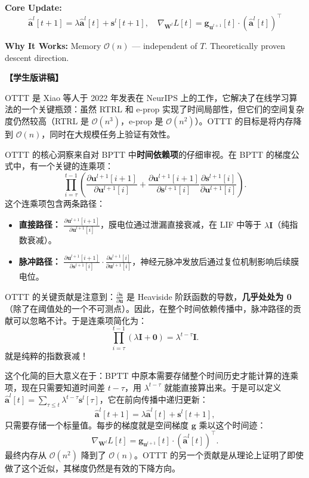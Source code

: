 \documentclass[journal,12pt,onecolumn]{IEEEtran}
\begin{document}
\textbf{Core Update:}
\begin{equation}
    \hat{\mathbf{a}}^l[t+1] = \lambda \hat{\mathbf{a}}^l[t] + \mathbf{s}^l[t+1], \quad 
    \nabla_{\mathbf{W}^l} L[t] = \mathbf{g}_{\mathbf{u}^{l+1}}[t] \cdot (\hat{\mathbf{a}}^l[t])^\top
\end{equation}

\textbf{Why It Works:} Memory $\mathcal{O}(n)$ — independent of $T$. Theoretically proven descent direction.


\textbf{【学生版讲稿】}

OTTT 是 Xiao 等人于 2022 年发表在 NeurIPS 上的工作，它解决了在线学习算法的一个关键瓶颈：虽然 RTRL 和 e-prop 实现了时间局部性，但它们的空间复杂度仍然较高（RTRL 是 $\mathcal{O}(n^3)$，e-prop 是 $\mathcal{O}(n^2)$）。OTTT 的目标是将内存降到 $\mathcal{O}(n)$，同时在大规模任务上验证有效性。

OTTT 的核心洞察来自对 BPTT 中\textbf{时间依赖项}的仔细审视。在 BPTT 的梯度公式中，有一个关键的连乘项：
\[
\prod_{i=\tau}^{t-1} \left( \frac{\partial \mathbf{u}^{l+1}[i+1]}{\partial \mathbf{u}^{l+1}[i]} + \frac{\partial \mathbf{u}^{l+1}[i+1]}{\partial \mathbf{s}^{l+1}[i]} \frac{\partial \mathbf{s}^{l+1}[i]}{\partial \mathbf{u}^{l+1}[i]} \right).
\]
这个连乘项包含两条路径：
\begin{itemize}
    \item \textbf{直接路径：} $\frac{\partial \mathbf{u}^{l+1}[i+1]}{\partial \mathbf{u}^{l+1}[i]}$，膜电位通过泄漏直接衰减，在 LIF 中等于 $\lambda \mathbf{I}$（纯指数衰减）。
    \item \textbf{脉冲路径：} $\frac{\partial \mathbf{u}^{l+1}[i+1]}{\partial \mathbf{s}^{l+1}[i]} \cdot \frac{\partial \mathbf{s}^{l+1}[i]}{\partial \mathbf{u}^{l+1}[i]}$，神经元脉冲发放后通过复位机制影响后续膜电位。
\end{itemize}

OTTT 的关键贡献是注意到：$\frac{\partial \mathbf{s}}{\partial \mathbf{u}}$ 是 Heaviside 阶跃函数的导数，\textbf{几乎处处为 0}（除了在阈值处的一个不可测点）。因此，在整个时间依赖传播中，脉冲路径的贡献可以忽略不计。于是连乘项简化为：
\[
\prod_{i=\tau}^{t-1} \left( \lambda \mathbf{I} + \mathbf{0} \right) = \lambda^{t-\tau} \mathbf{I}.
\]
就是纯粹的指数衰减！

这个化简的巨大意义在于：BPTT 中原本需要存储整个时间历史才能计算的连乘项，现在只需要知道时间差 $t-\tau$，用 $\lambda^{t-\tau}$ 就能直接算出来。于是可以定义 $\hat{\mathbf{a}}^l[t] = \sum_{\tau \le t} \lambda^{t-\tau} \mathbf{s}^l[\tau]$，它在前向传播中递归更新：
\[
\hat{\mathbf{a}}^l[t+1] = \lambda \hat{\mathbf{a}}^l[t] + \mathbf{s}^l[t+1],
\]
只需要存储一个标量值。每步的梯度就是空间梯度 $\mathbf{g}$ 乘以这个时间迹：
\[
\nabla_{\mathbf{W}^l} L[t] = \mathbf{g}_{\mathbf{u}^{l+1}}[t] \cdot (\hat{\mathbf{a}}^l[t])^\top.
\]
最终内存从 $\mathcal{O}(n^2)$ 降到了 $\mathcal{O}(n)$。OTTT 的另一个贡献是从理论上证明了即使做了这个近似，其梯度仍然是有效的下降方向。
\end{document}
